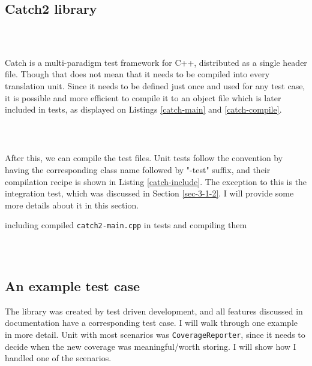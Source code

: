\documentclass{elteikthesis}[2018/06/06]
\newcommand*{\code}{\lstinline[keywordstyle=\color{violet}, basicstyle=\color{violet}]}
\begin{document}
\subsection{Catch2 library}
\label{sec-3-3-1}
\begin{listing}
\caption{\label{catch-main}contents of \code{test/catch2-main.cpp} defining the main function for test framework}
\inputminted{c++}{test/catch2-main.cpp} \\
\end{listing}

Catch is a multi-paradigm test framework for C++, distributed as a single header file. Though that does not mean that it needs to be compiled into every translation unit.  Since it needs to be defined just once and used for any test case, it is possible and more efficient\cite{catch slow compile} to compile it to an object file which is later included in tests, as displayed on Listings \ref{catch-main} and \ref{catch-compile}. \\

\begin{listing}
\caption{\label{catch-compile}compiling contents of \code{test/catch-main.cpp}}
\inputminted[firstline=70,lastline=75]{bash}{Makefile} \\
\end{listing}

After this, we can compile the test files. Unit tests follow the convention by having the corresponding class name followed by "-test" suffix, and their compilation recipe is shown in Listing \ref{catch-include}. The exception to this is the integration test, which was discussed in Section \ref{sec-3-1-2}. I will provide some more details about it in this section. \\

\begin{listing}
\caption{\label{catch-include}including compiled \code{catch2-main.cpp} in tests and compiling them}
\inputminted[firstline=77,lastline=91,breaklines]{bash}{Makefile} \\
\end{listing}


\subsection{An example test case}
\label{sec-3-3-2}
The library was created by test driven development, and all features discussed in documentation have a corresponding test case. I will walk through one example in more detail. Unit with most scenarios was \code{CoverageReporter}, since it needs to decide when the new coverage was meaningful/worth storing. I will show how I handled one of the scenarios. \\
\end{document}
